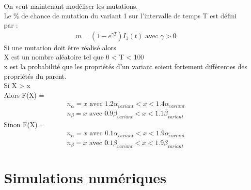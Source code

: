 \documentclass{article}
\begin{document}
\noindent
On veut maintenant modéliser les mutations.\\
Le \% de chance de mutation du variant 1 sur l'intervalle de temps T est défini par :
\begin{align}
    m = (1-e^{\gamma T})I_1(t) \text{ avec }\gamma > \text{0}
\end{align}
\noindent
Si une mutation doit être réalisé alors \\
\noindent
X est un nombre aléatoire tel que 0 < T < 100 \\
x est la probabilité que les propriétés d'un variant soient fortement différentes des propriétés du parent.\\
Si X > x \\
Alors F(X) =
\begin{align}
    n_\alpha = x \text{ avec } 1.2\alpha_{variant} < x < 1.4\alpha_{variant}  \\
    n_\beta = x \text{ avec } 0.9\beta_{variant}  < x < 1.1\beta_{variant}
\end{align}
\noindent
Sinon F(X) = \\
\begin{align}
    n_\alpha= x \text{ avec } 0.1\alpha_{variant} < x < 1.9\alpha_{variant} \\
    n_\beta= x \text{ avec } 0.1\beta_{variant} < x < 1.9\beta_{variant}
\end{align}


\section{Simulations numériques}
\end{document}
